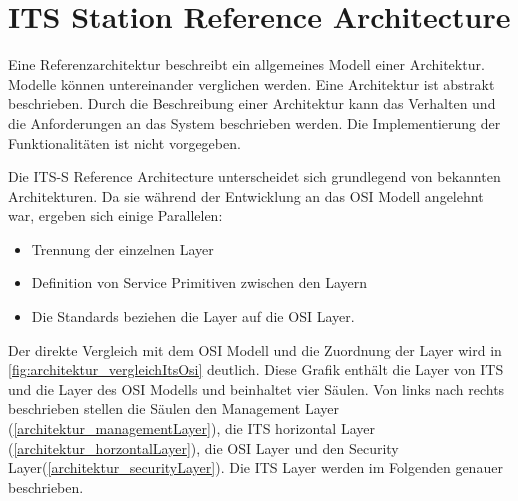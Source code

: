  
\section{ITS Station Reference Architecture}
Eine Referenzarchitektur beschreibt ein allgemeines Modell einer Architektur. Modelle können untereinander verglichen werden. Eine Architektur ist abstrakt beschrieben. Durch die Beschreibung einer Architektur kann das Verhalten und die Anforderungen an das System beschrieben werden. Die Implementierung der Funktionalitäten ist nicht vorgegeben. 

Die \ac{ITS-S} Reference Architecture unterscheidet sich grundlegend von bekannten Architekturen. Da sie während der Entwicklung an das \ac{OSI} Modell angelehnt war, ergeben sich einige Parallelen:
\begin{itemize}
	\item Trennung der einzelnen Layer
	\item Definition von Service Primitiven zwischen den Layern
	\item Die Standards beziehen die Layer auf die \ac{OSI} Layer. 
\end{itemize}

Der direkte Vergleich mit dem \ac{OSI} Modell und die Zuordnung der Layer wird in \autoref{fig:architektur_vergleichItsOsi} deutlich. Diese Grafik enthält die Layer von \ac{ITS} und die Layer des \ac{OSI} Modells und beinhaltet vier Säulen. Von links nach rechts beschrieben stellen die Säulen den Management Layer  (\autoref{architektur_managementLayer}), die \ac{ITS} horizontal Layer (\autoref{architektur_horzontalLayer}), die \ac{OSI} Layer und den Security Layer(\autoref{architektur_securityLayer}). Die \ac{ITS} Layer werden im Folgenden genauer beschrieben. 

